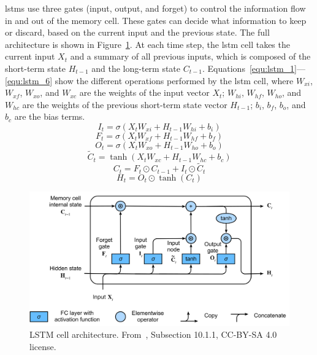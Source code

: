 \acrshort{lstm}s use three gates (input, output, and forget) to control the information flow in and out of the memory cell. These gates can decide what information to keep or discard, based on the current input and the previous state. The full architecture is shown in Figure~\ref{fig:lstm_architecture}. At each time step, the \acrshort{lstm} cell takes the current input $X_t$ and a summary of all previous inputs, which is composed of the short-term state $H_{t-1}$ and the long-term state $C_{t-1}$. Equations~\eqref{equ:lstm_1}---\eqref{equ:lstm_6} show the different operations performed by the \acrshort{lstm} cell, where $W_{xi}$, $W_{xf}$, $W_{xo}$, and $W_{xc}$ are the weights of the input vector $X_t$; $W_{hi}$, $W_{hf}$, $W_{ho}$, and $W_{hc}$ are the weights of the previous short-term state vector $H_{t-1}$; $b_i$, $b_f$, $b_o$, and $b_c$ are the bias terms.
\begin{equation}\label{equ:lstm_1}
  I_t = \sigma(X_{t}W_{xi} + H_{t-1}W_{hi} + b_{i})
\end{equation}
\begin{equation}\label{equ:lstm_2}
  F_t = \sigma(X_{t}W_{xf} + H_{t-1}W_{hf} + b_{f})
\end{equation}
\begin{equation}\label{equ:lstm_4}
  O_t = \sigma(X_{t}W_{xo} + H_{t-1}W_{ho} + b_{o})
\end{equation}
\begin{equation}\label{equ:lstm_3}
  \tilde{C}_t = \tanh(X_{t}W_{xc} + H_{t-1}W_{hc} + b_{c})
\end{equation}
\begin{equation}\label{equ:lstm_5}
  C_t = F_t \odot C_{t-1} + I_t \odot \tilde{C}_t
\end{equation}
\begin{equation}\label{equ:lstm_6}
  H_t = O_t \odot \tanh(C_t)
\end{equation}

\begin{figure}
  \centering
  \includegraphics[width=.65\linewidth]{images/modes_clustering/lstm.png}
  \caption[LSTM cell architecture]{LSTM cell architecture. From~\cite{zhangDiveDeepLearning2023}, Subsection 10.1.1, CC-BY-SA 4.0 license.}
  \label{fig:lstm_architecture}
\end{figure}

